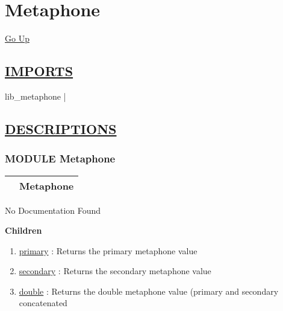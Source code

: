 \chapter*{\color{headfile}
Metaphone
}
\hypertarget{ecldoc:toc:Metaphone}{}
\hyperlink{ecldoc:toc:root}{Go Up}

\section*{\underline{\textsf{IMPORTS}}}
\begin{doublespace}
{\large
lib\_metaphone |
}
\end{doublespace}

\section*{\underline{\textsf{DESCRIPTIONS}}}
\subsection*{\textsf{\colorbox{headtoc}{\color{white} MODULE}
Metaphone}}

\hypertarget{ecldoc:Metaphone}{}

{\renewcommand{\arraystretch}{1.5}
\begin{tabularx}{\textwidth}{|>{\raggedright\arraybackslash}l|X|}
\hline
\hspace{0pt}\mytexttt{\color{red} } & \textbf{Metaphone} \\
\hline
\end{tabularx}
}

\par





No Documentation Found







\textbf{Children}
\begin{enumerate}
\item \hyperlink{ecldoc:metaphone.primary}{primary}
: Returns the primary metaphone value
\item \hyperlink{ecldoc:metaphone.secondary}{secondary}
: Returns the secondary metaphone value
\item \hyperlink{ecldoc:metaphone.double}{double}
: Returns the double metaphone value (primary and secondary concatenated
\end{enumerate}

